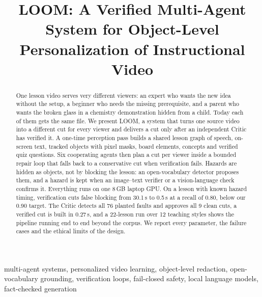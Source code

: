 \documentclass[conference,a4paper]{IEEEtran}
\begin{document}
\title{LOOM: A Verified Multi-Agent System for Object-Level Personalization of Instructional Video}

\author{
}

\maketitle

\begin{abstract}
One lesson video serves very different viewers: an expert who wants the new idea without the setup, a beginner who
needs the missing prerequisite, and a parent who wants the broken glass in a chemistry demonstration hidden from a
child. Today each of them gets the same file. We present LOOM, a system that turns one source video into a different
cut for every viewer and delivers a cut only after an independent Critic has verified it. A one-time perception pass
builds a shared lesson graph of speech, on-screen text, tracked objects with pixel masks, board elements, concepts and
verified quiz questions. Six cooperating agents then plan a cut per viewer inside a bounded repair loop that falls
back to a conservative cut when verification fails. Hazards are hidden as objects, not by blocking the lesson: an
open-vocabulary detector proposes them, and a hazard is kept when an image--text verifier or a vision-language check
confirms it. Everything runs on one 8\,GB laptop GPU. On a lesson with known hazard timing, verification cuts false
blocking from 30.1\,s to 0.5\,s at a recall of 0.80, below our 0.90 target. The Critic detects all 76 planted faults
and approves all 9 clean cuts, a verified cut is built in 0.27\,s, and a 22-lesson run over 12 teaching styles shows
the pipeline running end to end beyond the corpus. We report every parameter, the failure cases and the ethical
limits of the design.
\end{abstract}

\begin{IEEEkeywords}
multi-agent systems, personalized video learning, object-level redaction, open-vocabulary grounding, verification
loops, fail-closed safety, local language models, fact-checked generation
\end{IEEEkeywords}
\end{document}
